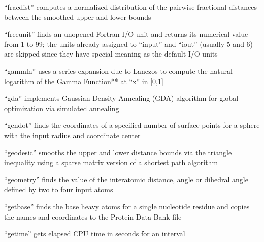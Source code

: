 \documentclass[letterpaper,11pt,english]{sphinxmanual}
\begin{document}

“fracdist” computes a normalized distribution of the pairwise fractional distances between the smoothed upper and lower bounds


“freeunit” finds an unopened Fortran I/O unit and returns its numerical value from 1 to 99; the units already assigned to “input” and “iout” (usually 5 and 6) are skipped since they have special meaning as the default I/O units


“gammln” uses a series expansion due to Lanczos to compute the natural logarithm of the Gamma Function** at “x” in {[}0,1{]}


“gda” implements Gaussian Density Annealing (GDA) algorithm for global optimization via simulated annealing






“gendot” finds the coordinates of a specified number of surface points for a sphere with the input radius and coordinate center


“geodesic” smooths the upper and lower distance bounds via the triangle inequality using a sparse matrix version of a shortest path algorithm


“geometry” finds the value of the interatomic distance, angle or dihedral angle defined by two to four input atoms


“getbase” finds the base heavy atoms for a single nucleotide residue and copies the names and coordinates to the Protein Data Bank file


“getime” gets elapsed CPU time in seconds for an interval

\end{document}
